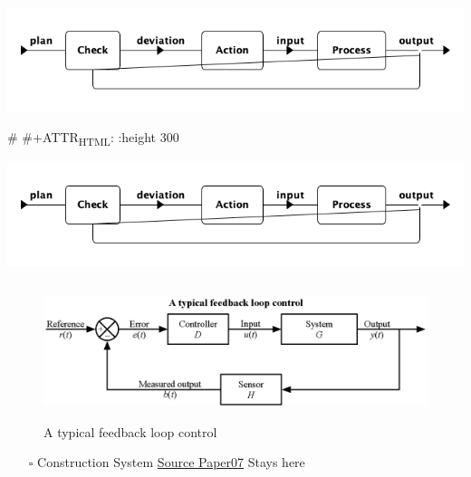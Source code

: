 \documentclass{article}
\begin{document}
\begin{center}
\includegraphics[width=.9\linewidth]{Figures/system_feedback_loop.png}
\end{center}

\# \#+ATTR\textsubscript{HTML}: :height 300

\begin{center}
\includegraphics[width=.9\linewidth]{Figures/system_feedback_loop.png}
\end{center}






\begin{figure}[htbp]
\centering
\includegraphics[height=150]{./Figures/A_typical_feedback_loop_control.eps}
\caption{\label{fig:org0101650}A typical feedback loop control}
\end{figure}


\begin{itemize}
\item[{$\square$}] Construction System
\uline{Source Paper07} Stays here
\end{itemize}
\end{document}
